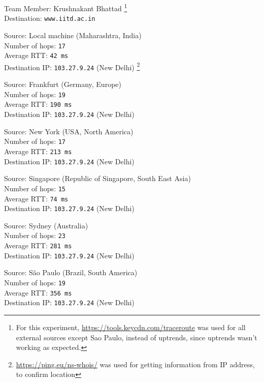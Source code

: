 \documentclass[11pt, fleqn]{article}
\begin{document}
\newpage
Team Member: Krushnakant Bhattad \footnote{For this experiment, \url{https://tools.keycdn.com/traceroute} was used 
for all external sources except Sao Paulo, instead of uptrends, since uptrends wasn't working as expected. }\\
Destination: \texttt{www.iitd.ac.in}

\hrulefill
\smallskip

Source: Local machine (Maharashtra, India)\\
Number of hops: \texttt{17}\\
Average RTT: \texttt{42 ms}\\
Destination IP: \texttt{103.27.9.24} (New Delhi)  \footnote{
\url{https://ping.eu/ns-whois/} was used for 
getting information from IP address, to confirm location}


\hrulefill
\smallskip

Source: Frankfurt (Germany, Europe)\\
Number of hops: \texttt{19}\\
Average RTT: \texttt{190 ms}\\
Destination IP: \texttt{103.27.9.24} (New Delhi)  


\hrulefill
\smallskip

Source: New York (USA, North America) \\
Number of hops: \texttt{17}\\
Average RTT: \texttt{213 ms}\\
Destination IP: \texttt{103.27.9.24} (New Delhi)  


\hrulefill
\smallskip

Source: Singapore (Republic of Singapore, South East Asia)\\
Number of hops: \texttt{15}\\
Average RTT: \texttt{74 ms}\\
Destination IP: \texttt{103.27.9.24} (New Delhi)  


\hrulefill
\smallskip

Source: Sydney (Australia)\\
Number of hops: \texttt{23}\\
Average RTT: \texttt{281 ms}\\
Destination IP: \texttt{103.27.9.24} (New Delhi)  


\hrulefill
\smallskip

Source: São Paulo (Brazil, South America)\\
Number of hops: \texttt{19}\\
Average RTT: \texttt{356 ms}\\
Destination IP: \texttt{103.27.9.24} (New Delhi)  
\end{document}
